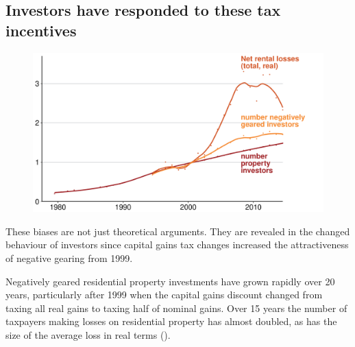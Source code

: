 \documentclass{grattanAlpha}\usepackage[]{graphicx}\usepackage[]{color}
\begin{document}
\subsection{Investors have responded to these tax incentives}
\begin{figure}
\label{fig:number-NG-and-net-losses-time-series}
\includegraphics[width=1.16\columnwidth]{CGT-NG-atlas/NG-over-time.pdf}
\end{figure}
These biases are not just theoretical arguments. 
They are revealed in the changed behaviour of investors since capital gains tax changes increased the attractiveness of negative gearing from 1999.

Negatively geared residential property investments have grown rapidly over 20 years, particularly after 1999 when the capital gains discount changed from taxing all real gains to taxing half of nominal gains. 
Over 15 years the number of taxpayers making losses on residential property has almost doubled, as has the size of the average loss in real terms ().  
\end{document}
